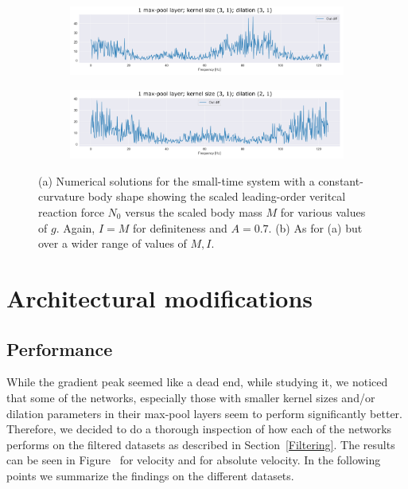 \begin{figure}
\centering
\begin{subfigure}[b]{0.95\textwidth}
   \includegraphics[width=1\linewidth]{img/ch4/absVel-maxpool-k3-d3}
   \caption{}
   \label{fig:Ng1} 
\end{subfigure}

\begin{subfigure}[b]{0.95\textwidth}
   \includegraphics[width=1\linewidth]{img/ch4/absVel-maxpool-k3-d2}
   \caption{}
   \label{fig:Ng2}
\end{subfigure}
\caption[Two numerical solutions]{(a) Numerical solutions for the small-time system 
with a constant-curvature body shape showing the scaled leading-order veritcal 
reaction force $N_0$ versus the scaled body mass $M$ for various values of $g$. 
Again, $I=M$ for definiteness and $A=0.7$. (b) As for (a) but over a wider range of 
values of $M,I$.}
\end{figure}

\section{Architectural modifications}\label{sec:architectural-modifications}
\subsection{Performance}\label{subsec:performance}
While the gradient peak seemed like a dead end, while studying it, we noticed that some of the networks, especially those with smaller kernel sizes and/or dilation parameters in their max-pool layers seem to perform significantly better.
Therefore, we decided to do a thorough inspection of how each of the networks performs on the filtered datasets as described in Section~\ref{Filtering}.
The results can be seen in Figure~\cite{Figure} for velocity and \cite{Figure} for absolute velocity.
In the following points we summarize the findings on the different datasets.

